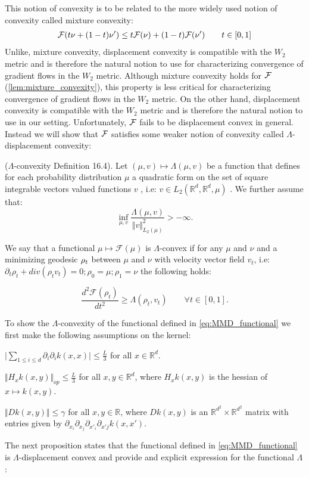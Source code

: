 This notion of convexity is to be related to the more widely used notion of convexity called mixture convexity:
\begin{align}
	{{\mathcal F}}(t\nu +(1-t)\nu')\leq t{{\mathcal F}}(\nu)+(1-t){{\mathcal F}}(\nu') \qquad t\in [0,1]
\end{align}
Unlike, mixture convexity, displacement convexity is compatible with the $W_2$ metric and is therefore the natural notion to use for characterizing convergence of gradient flows in the $W_2$ metric.
Although mixture convexity holds for ${{\mathcal F}}$ (\cref{lem:mixture_convexity}), this property is less critical for characterizing convergence of gradient flows in the $W_2$ metric. On the other hand, displacement convexity is compatible with the $W_2$ metric \cite{Bottou:2017} and is therefore the natural notion to use in our setting. Unfortunately, ${{\mathcal F}}$ fails to be displacement convex in general. Instead we will show that ${{\mathcal F}}$ satisfies some weaker notion of convexity called $\Lambda$-displacement convexity:
%
\begin{definition}
($\Lambda$-convexity \cite{Villani:2009} Definition 16.4). Let $(\mu,v)\mapsto\Lambda(\mu,v)$
be a function that defines for each probability distribution $\mu$
a quadratic form on the set of square integrable vectors valued functions
$v$ , i.e: $v\in L_{2}(\mathbb{R}^{d},\mathbb{R}^{d},\mu)$ . We
further assume that:
\[
\inf_{\mu,v}\frac{\Lambda(\mu,v)}{\Vert v\Vert_{L_{2}(\mu)}^{2}}>-\infty.
\]

We say that a functional $\mu\mapsto\mathcal{F}(\mu)$ is $\Lambda$-convex
if for any $\mu$ and $\nu$ and a minimizing geodesic $\text{\ensuremath{\rho_{t}}}$
between $\mu$ and $\nu$ with velocity vector field $v_{t}$, i.e:
$\partial_{t}\rho_{t}+div(\rho_{t}v_{t})=0;\rho_{0}=\mu;\rho_{1}=\nu$
the following holds:
\end{definition}
\[
\frac{d^{2}\mathcal{F}(\rho_{t})}{dt^{2}}\geq\Lambda(\rho_{t},v_{t})\qquad\forall t\in[0,1].
\]

To show the $\Lambda$-convexity of the functional defined in \cref{eq:MMD_functional} we first make the following assumptions on the kernel:
\begin{assumplist} 
\item \label{assump:bounded_trace} $ \vert \sum_{1\leq i\leq d} \partial_i\partial_ik(x,x) \vert\leq \frac{L}{3}  $ for all $x\in \mathbb{R}^d$.
\item \label{assump:bounded_hessian} $\Vert H_xk(x,y) \Vert_{op} \leq \frac{L}{3}$ for all $x,y\in \mathbb{R}^d$, where $H_xk(x,y)$ is the hessian of $x\mapsto k(x,y)$.
\item \label{assump:bounded_fourth_oder} $\Vert Dk(x,y) \Vert\leq \gamma  $ for all $x,y\in \mathbb{R}$, where $Dk(x,y)$ is an $\mathbb{R}^{d^2}\times \mathbb{R}^{d^2}$ matrix with entries given by $\partial_{x_{i}}\partial_{x_{j}}\partial_{x'_{i}}\partial_{x'j}k(x,x')$.
\end{assumplist}
The next proposition states that the functional defined in \cref{eq:MMD_functional} is $\Lambda$-displacement convex and provide and explicit expression for the functional $\Lambda$:

